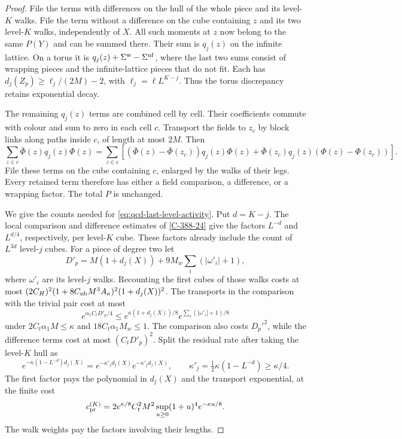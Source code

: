 \documentclass[11pt,letterpaper,reqno]{amsart}
\theoremstyle{definition}
\theoremstyle{remark}
\begin{document}
\begin{proof}
File the terms with differences on the hull of the whole
piece and its level-$K$ walks. File the term without a
difference on the cube containing $z$ and its two
level-$K$ walks, independently of $X$. All such moments
at $z$ now belong to the same $P(Y)$ and can be summed
there. Their sum is $q_j(z)$ on the infinite lattice.
On a torus it is $q_j(z)+\Sigma^{\rm w}-\Sigma^{\rm nf}$,
where the last two sums consist of wrapping pieces and
the infinite-lattice pieces that do not fit. Each has
$d_j(Z_p)\ge\ell_j/(2M)-2$, with $\ell_j=\ell L^{K-j}$.
Thus the torus discrepancy retains exponential decay.

The remaining $q_j(z)$ terms are combined cell by cell.
Their coefficients commute with colour and sum to zero
in each cell $c$. Transport the fields to $z_c$ by block
links along paths inside $c$, of length at most $2M$.
Then
\[
 \sum_{z\in c}\bar\Phi(z)q_j(z)\Phi(z)
 =\sum_{z\in c}\left[
 (\bar\Phi(z)-\bar\Phi(z_c))q_j(z)\Phi(z)
 +\bar\Phi(z_c)q_j(z)(\Phi(z)-\Phi(z_c))\right].
\]
File these terms on the cube containing $c$, enlarged by
the walks of their legs. Every retained term therefore
has either a field comparison, a difference, or a
wrapping factor. The total $P$ is unchanged.

We give the counts needed for \eqref{eq:qcd-last-level-activity}.
Put $d=K-j$. The local comparison and difference estimates
of \cref{C-388-24} give the factors $L^{-d}$ and $L^{d/4}$,
respectively, per level-$K$ cube. These factors already
include the count of $L^{3d}$ level-$j$ cubes. For a
piece of degree two let
\[
 D'_p=M(1+d_j(X))+9M_w\sum_i(|\omega'_i|+1),
\]
where $\omega'_i$ are its level-$j$ walks. Recounting the
first cubes of those walks costs at most
$(2C_H)^2(1+8C_{\rm nb}M^3A_\kappa)^2(1+d_j(X))^2$.
The transports in the comparison with the trivial pair
cost at most
\[
 e^{\alpha_1C_tD'_p/4}
 \le e^{\kappa(1+d_j(X))/8}
       e^{\sum_i(|\omega'_i|+1)/8}
\]
under $2C_t\alpha_1M\le\kappa$ and
$18C_t\alpha_1M_w\le1$.
The comparison also costs $D_p'^2$, while the difference
terms cost at most $(C_tD'_p)^2$.
Split the residual rate after taking the level-$K$ hull as
\[
 e^{-\kappa(1-L^{-d})d_j(X)}
       =e^{-\kappa'_jd_j(X)}e^{-\kappa'_jd_j(X)},
 \qquad\kappa'_j=\tfrac12\kappa(1-L^{-d})\ge\kappa/4.
\]
The first factor pays the polynomial in $d_j(X)$ and the
transport exponential, at the finite cost
\[
 c_{\rm pr}^{(K)}
 =2e^{\kappa/8}C_t^2M^2
                 \sup_{u\ge0}(1+u)^4e^{-\kappa u/8}.
\]
The walk weights pay the factors involving their lengths.


\end{proof}
\end{document}
